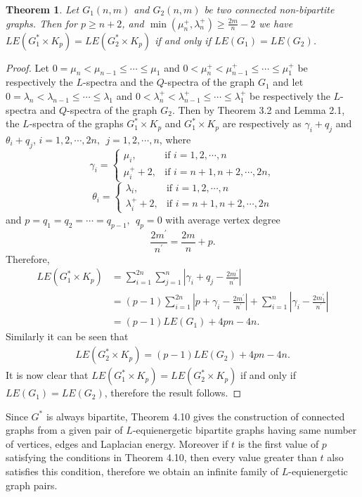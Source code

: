 \documentclass[12pt,a4paper]{amsart}
\newtheorem{theorem}{Theorem}[section]
\theoremstyle{theorem}
\theoremstyle{definition}
\numberwithin{equation}{section} \makeatletter
\begin{document}
\begin{theorem}
Let $G_1(n,m)$ and $G_2(n,m)$ be two connected non-bipartite graphs. Then for $p\geq n+2$, and $\min(\mu_n^+, \lambda_n^+)\geq \frac{2m}{n}-2$ we have $LE(G_1^*\times K_p)=LE(G_2^*\times K_p) $ if and only if $LE(G_1)=LE(G_2)$.
\end{theorem}
\begin{proof}
Let $0=\mu_n<\mu_{n-1}\leq\cdots\leq \mu_1$ and $0<\mu_n^+<\mu_{n-1}^+\leq\cdots\leq \mu_1^+$ be respectively the $L$-spectra and the $Q$-spectra of the graph $G_1$ and let $0=\lambda_n<\lambda_{n-1}\leq\cdots\leq \lambda_1$ and $0<\lambda_n^+<\lambda_{n-1}^+\leq\cdots\leq \lambda_1^+$ be respectively the $L$-spectra and $Q$-spectra of the graph $G_2$. Then by Theorem 3.2 and Lemma 2.1, the $L$-spectra of the graphs $G_1^*\times K_p$ and $G_1^*\times K_p$ are respectively as $\gamma_i+q_j$ and $\theta_i+q_j$, $i=1,2,\cdots,2n,~~j=1,2,\cdots,n$, where
$$\gamma_i=\left \{\begin{array}{lr}\mu_i, &\mbox{if $i=1,2,\cdots,n$}\\
\mu_i^{+}+2, &\mbox{if $i=n+1,n+2,\cdots,2n,$}
\end{array} \right.$$
$$\theta_i=\left \{\begin{array}{lr}\lambda_i, &\mbox{if $i=1,2,\cdots,n$ }\\
\lambda_i^{+}+2, &\mbox{if $i=n+1,n+2,\cdots,2n$}
\end{array} \right.$$
 and $p=q_1=q_2=\cdots=q_{p-1},~~ q_p=0$
with average vertex degree $$\frac{2m^{\prime}}{n^{\prime}}=\frac{2m}{n}+p.$$
Therefore,
\begin{align*}
LE(G_1^*\times K_p)&=\sum\limits_{i=1}^{2n}\sum\limits_{j=1}^{n}|\gamma_i+q_j-\frac{2m^{\prime}}{n^{\prime}}|\\&=(p-1)\sum\limits_{i=1}^{2n}|p+\gamma_i-\frac{2m^{\prime}}{n^{\prime}}|+\sum\limits_{i=1}^{n}|\gamma_i-\frac{2m_1^{\prime}}{n^{\prime}}|\\&
=(p-1)LE(G_1)+4pn-4n.
\end{align*}
\indent Similarly it can be seen that
\begin{align*}
LE(G_2^*\times K_p)=(p-1)LE(G_2)+4pn-4n.
\end{align*}
 \indent It is now clear that $LE(G_1^*\times K_p)=LE(G_2^*\times K_p) $ if and only if $LE(G_1)=LE(G_2)$, therefore the result follows.
\end{proof}
\indent Since $G^*$ is always bipartite, Theorem 4.10 gives the construction of connected graphs from a given pair of $L$-equienergetic bipartite graphs having same number of vertices, edges and Laplacian energy. Moreover if $t$ is the first value of $p$ satisfying the conditions in Theorem 4.10, then every value greater than $t$ also satisfies this condition, therefore we obtain an infinite family of $L$-equienergetic graph pairs.
\end{document}
